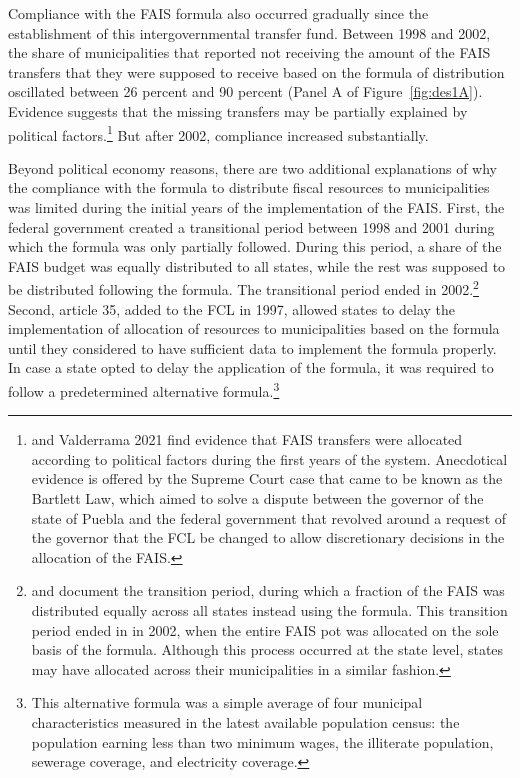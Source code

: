 \documentclass[dv_diss_main.tex]{subfiles}
\begin{document}
  Compliance with the FAIS formula also occurred gradually since the establishment of this intergovernmental transfer fund. Between 1998 and 2002, the share of municipalities that reported not receiving the amount of the FAIS transfers that they were supposed to receive based on the formula of distribution oscillated between 26 percent and 90 percent (Panel A of Figure~\ref{fig:des1A}). Evidence suggests that the missing transfers may be partially explained by political factors.\footnote{\cite{diaz2016political} and Valderrama 2021 find evidence that FAIS transfers were allocated according to political factors during the first years of the system. Anecdotical evidence is offered by the Supreme Court case that came to be known as the Bartlett Law, which aimed to solve a dispute between the governor of the state of Puebla and the federal government that revolved around a request of the governor that the FCL be changed to allow discretionary decisions in the allocation of the FAIS.} But after 2002, compliance increased substantially. 

Beyond political economy reasons, there are two additional explanations of why the compliance with the formula to distribute fiscal resources to municipalities was limited during the initial years of the implementation of the FAIS. First, the federal government created a transitional period between 1998 and 2001 during which the formula was only partially followed. During this period, a share of the FAIS budget was equally distributed to all states, while the rest was supposed to be distributed following the formula. The transitional period ended in 2002.\footnote{ \cite{mogollon2002discrecion} and \cite{diaz2016political} document the transition period, during which a fraction of the FAIS was distributed equally across all states instead using the formula. This transition period ended in in 2002, when the entire FAIS pot was allocated on the sole basis of the formula. Although this process occurred at the state level, states may have allocated across their municipalities in a similar fashion.} Second, article 35, added to the FCL in 1997, allowed states to delay the implementation of allocation of resources to municipalities based on the formula until they considered to have sufficient data to implement the formula properly. In case a state opted to delay the application of the formula, it was required to follow a predetermined alternative formula.\footnote{This alternative formula was a simple average of four municipal characteristics measured in the latest available population census: the population earning less than two minimum wages, the illiterate population, sewerage coverage, and electricity coverage.}
\end{document}
